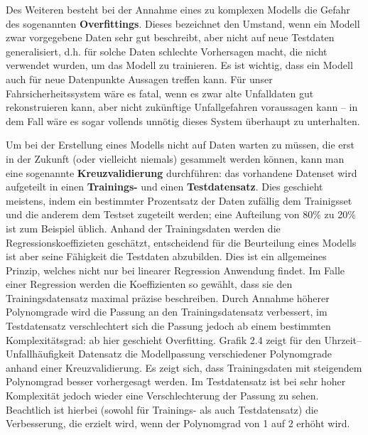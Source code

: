 Des Weiteren besteht bei der Annahme eines zu komplexen Modells die Gefahr des
sogenannten \textbf{Overfittings}. Dieses bezeichnet den Umstand, wenn ein Modell
zwar vorgegebene Daten sehr gut beschreibt, aber nicht auf neue Testdaten
generalisiert, d.h. für solche Daten schlechte Vorhersagen macht, die nicht verwendet
wurden, um das Modell zu trainieren. Es ist wichtig, dass ein Modell auch für neue
Datenpunkte Aussagen treffen kann. Für unser Fahrsicherheitssystem wäre es fatal,
wenn es zwar alte Unfalldaten gut rekonstruieren kann, aber nicht zukünftige
Unfallgefahren voraussagen kann -- in dem Fall wäre es sogar vollends unnötig dieses
System überhaupt zu unterhalten.

Um bei der Erstellung eines Modells nicht auf Daten warten zu müssen, die erst in der
Zukunft (oder vielleicht niemals) gesammelt werden können, kann man eine sogenannte
\textbf{Kreuzvalidierung} durchführen: das vorhandene Datenset wird aufgeteilt in
einen \textbf{Trainings-} und einen \textbf{Testdatensatz}. Dies geschieht meistens,
indem ein bestimmter Prozentsatz der Daten zufällig dem Trainigsset und die anderem
dem Testset zugeteilt werden; eine Aufteilung von 80\% zu 20\% ist zum Beispiel
üblich. Anhand der Trainingsdaten werden die Regressionskoeffizieten geschätzt,
entscheidend für die Beurteilung eines Modells ist aber seine Fähigkeit die Testdaten
abzubilden. Dies ist ein allgemeines Prinzip, welches nicht nur bei linearer
Regression Anwendung findet. Im Falle einer Regression werden die Koeffizienten so
gewählt, dass sie den Trainingsdatensatz maximal präzise beschreiben. Durch
Annahme höherer Polynomgrade wird die Passung an den Trainingsdatensatz verbessert,
im Testdatensatz verschlechtert sich die Passung jedoch ab einem bestimmten
Komplexitätsgrad: ab hier geschieht Overfitting. Grafik 2.4 zeigt für den Uhrzeit--Unfallhäufigkeit Datensatz die Modellpassung verschiedener Polynomgrade anhand einer
Kreuzvalidierung. Es zeigt sich, dass Trainingsdaten mit steigendem Polynomgrad
besser vorhergesagt werden. Im Testdatensatz ist bei sehr hoher Komplexität jedoch
wieder eine Verschlechterung der Passung zu sehen. Beachtlich ist hierbei (sowohl für
Trainings- als auch Testdatensatz) die Verbesserung, die erzielt wird, wenn der
Polynomgrad von 1 auf 2 erhöht wird.

